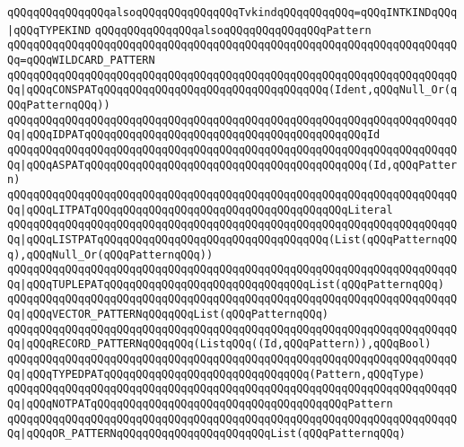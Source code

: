 \verb|qQQqqQQqqQQqqQQqalsoqQQqqQQqqQQqqQQqTvkindqQQqqQQqqQQq=qQQqINTKINDqQQq|\verb#|qQQqTYPEKIND#\newline
\newline
\verb|qQQqqQQqqQQqqQQqalsoqQQqqQQqqQQqqQQqPattern|\newline
\verb|qQQqqQQqqQQqqQQqqQQqqQQqqQQqqQQqqQQqqQQqqQQqqQQqqQQqqQQqqQQqqQQqqQQqqQQq=qQQqWILDCARD_PATTERN|\newline
\verb|qQQqqQQqqQQqqQQqqQQqqQQqqQQqqQQqqQQqqQQqqQQqqQQqqQQqqQQqqQQqqQQqqQQqqQQq|\verb#|qQQqCONSPATqQQqqQQqqQQqqQQqqQQqqQQqqQQqqQQqqQQq(Ident,qQQqNull_Or(qQQqPatternqQQq))#\newline
\verb|qQQqqQQqqQQqqQQqqQQqqQQqqQQqqQQqqQQqqQQqqQQqqQQqqQQqqQQqqQQqqQQqqQQqqQQq|\verb#|qQQqIDPATqQQqqQQqqQQqqQQqqQQqqQQqqQQqqQQqqQQqqQQqqQQqId#\newline
\verb|qQQqqQQqqQQqqQQqqQQqqQQqqQQqqQQqqQQqqQQqqQQqqQQqqQQqqQQqqQQqqQQqqQQqqQQq|\verb#|qQQqASPATqQQqqQQqqQQqqQQqqQQqqQQqqQQqqQQqqQQqqQQqqQQq(Id,qQQqPattern)#\newline
\verb|qQQqqQQqqQQqqQQqqQQqqQQqqQQqqQQqqQQqqQQqqQQqqQQqqQQqqQQqqQQqqQQqqQQqqQQq|\verb#|qQQqLITPATqQQqqQQqqQQqqQQqqQQqqQQqqQQqqQQqqQQqqQQqLiteral#\newline
\verb|qQQqqQQqqQQqqQQqqQQqqQQqqQQqqQQqqQQqqQQqqQQqqQQqqQQqqQQqqQQqqQQqqQQqqQQq|\verb#|qQQqLISTPATqQQqqQQqqQQqqQQqqQQqqQQqqQQqqQQqqQQq(List(qQQqPatternqQQq),qQQqNull_Or(qQQqPatternqQQq))#\newline
\verb|qQQqqQQqqQQqqQQqqQQqqQQqqQQqqQQqqQQqqQQqqQQqqQQqqQQqqQQqqQQqqQQqqQQqqQQq|\verb#|qQQqTUPLEPATqQQqqQQqqQQqqQQqqQQqqQQqqQQqqQQqList(qQQqPatternqQQq)#\newline
\verb|qQQqqQQqqQQqqQQqqQQqqQQqqQQqqQQqqQQqqQQqqQQqqQQqqQQqqQQqqQQqqQQqqQQqqQQq|\verb#|qQQqVECTOR_PATTERNqQQqqQQqList(qQQqPatternqQQq)#\newline
\verb|qQQqqQQqqQQqqQQqqQQqqQQqqQQqqQQqqQQqqQQqqQQqqQQqqQQqqQQqqQQqqQQqqQQqqQQq|\verb#|qQQqRECORD_PATTERNqQQqqQQq(ListqQQq((Id,qQQqPattern)),qQQqBool)#\newline
\verb|qQQqqQQqqQQqqQQqqQQqqQQqqQQqqQQqqQQqqQQqqQQqqQQqqQQqqQQqqQQqqQQqqQQqqQQq|\verb#|qQQqTYPEDPATqQQqqQQqqQQqqQQqqQQqqQQqqQQqqQQq(Pattern,qQQqType)#\newline
\verb|qQQqqQQqqQQqqQQqqQQqqQQqqQQqqQQqqQQqqQQqqQQqqQQqqQQqqQQqqQQqqQQqqQQqqQQq|\verb#|qQQqNOTPATqQQqqQQqqQQqqQQqqQQqqQQqqQQqqQQqqQQqqQQqPattern#\newline
\verb|qQQqqQQqqQQqqQQqqQQqqQQqqQQqqQQqqQQqqQQqqQQqqQQqqQQqqQQqqQQqqQQqqQQqqQQq|\verb#|qQQqOR_PATTERNqQQqqQQqqQQqqQQqqQQqqQQqList(qQQqPatternqQQq)#\newline
